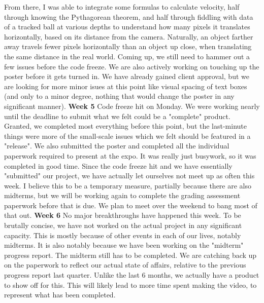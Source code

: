 \documentclass[onecolumn, draftclsnofoot,10pt, compsoc]{IEEEtran}
\begin{document}
\newline
From there, I was able to integrate some formulas to calculate velocity, half through knowing the Pythagorean theorem, and half through fiddling with data of a tracked ball at various depths to understand how many pixels it translates horizontally, based on its distance from the camera. Naturally, an object farther away travels fewer pixels horizontally than an object up close, when translating the same distance in the real world.
\newline
Coming up, we still need to hammer out a few issues before the code freeze. We are also actively working on touching up the poster before it gets turned in. We have already gained client approval, but we are looking for more minor isues at this point like visual spacing of text boxes (and only to a minor degree, nothing that would change the poster in any significant manner).
\newline
\textbf{Week 5}
\newline
Code freeze hit on Monday. We were working nearly until the deadline to submit what we felt could be a "complete" product. Granted, we completed most everything before this point, but the last-minute things were more of the small-scale issues which we felt should be featured in a "release".
\newline
We also submitted the poster and completed all the individual paperwork required to present at the expo. It was really just busywork, so it was completed in good time.
\newline
Since the code freeze hit and we have essentially "submitted" our project, we have actually let ourselves not meet up as often this week. I believe this to be a temporary measure, partially because there are also midterms, but we will be working again to complete the grading assessment paperwork before that is due. We plan to meet over the weekend to bang most of that out.
\newline
\textbf{Week 6}
\newline
No major breakthroughs have happened this week. To be brutally concise, we have not worked on the actual project in any significant capacity. This is mostly because of other events in each of our lives, notably midterms. It is also notably because we have been working on the "midterm" progress report.
\newline
The midterm still has to be completed. We are catching back up on the paperwork to reflect our actual state of affairs, relative to the previous progress report last quarter. Unlike the last 6 months, we actually have a product to show off for this. This will likely lead to more time spent making the video, to represent what has been completed.
\end{document}
